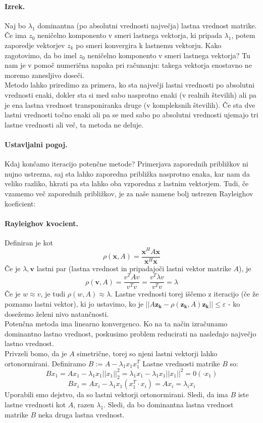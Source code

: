\documentclass[a4paper]{article}
\begin{document}
\paragraph{Izrek.} Naj bo \(\lambda_1\) dominantna (po absolutni vrednosti največja) lastna vrednost matrike. Če ima \(z_0\) neničelno komponento v smeri lastnega
vektorja, ki pripada \(\lambda_1\), potem zaporedje vektorjev \(z_k\) po smeri konvergira k lastnemu vektorju.
Kako zagotovimo, da bo imel \(z_0\) neničelno komponento v smeri lastnega vektorja? Tu nam je v pomoč numerična napaka pri računanju:
takega vektorja enostavno ne moremo zanesljivo doseči. \\
Metodo lahko priredimo za primera, ko sta največji lastni vrednosti po absolutni vrednosti enaki, dokler sta si med sabo nasprotno enaki (v realnih številih) ali
pa je ena lastna vrednost transponiranka druge (v kompleksnih številih). Če sta dve lastni vrednosti točno enaki ali pa se med sabo po absolutni vrednosti
ujemajo tri lastne vrednosti ali več, ta metoda ne deluje.
\paragraph{Ustavljalni pogoj.} Kdaj končamo iteracijo potenčne metode? Primerjava zaporednih približkov ni nujno ustrezna, saj sta lahko zaporedna približka nasprotno enaka,
kar nam da veliko razliko, hkrati pa sta lahko oba vzporedna z lastnim vektorjem. Tudi, če vzamemo več zaporednih približkov, je za naše namene bolj ustrezen Rayleighov koeficient:
\paragraph{Rayleighov kvocient.} Definiran je kot 
$$\rho (\mathbf{x}, A) = \frac{\mathbf{x}^HA\mathbf{x}}{\mathbf{x}^H\mathbf{x}}$$
Če je $\lambda, \mathbf{v}$ lastni par (lastna vrednost in pripadajoči lastni vektor matrike $A$), je
$$\rho (\mathbf{v}, A) = \frac{v^TAv}{v^Tv} = \frac{v^T\lambda v}{v^Tv} = \lambda$$
Če je $w \approx v$, je tudi $\rho (w, A) \approx \lambda$. Lastne vrednosti torej iščemo z iteracijo (če že poznamo lastni vektor),
ki jo ustavimo, ko je $||A\mathbf{z_k} - \rho(\mathbf{z_k}, A)\mathbf{z_k}|| \leq \varepsilon$ - ko dosežemo želeni nivo natančnosti. \\
Potenčna metoda ima linearno konvergenco.
Ko na ta način izračunamo dominantno lastno vrednost, poskusimo problem reducirati na naslednjo največjo lastno vrednost. \\
Privzeli bomo, da je $A$ simetrične, torej so njeni lastni vektorji lahko ortonormirani. Definiramo $B := A - \lambda_1x_1x^T_1$
Lastne vrednosti matrike $B$ so:
$$Bx_1 = Ax_1 - \lambda_1x_1||x_1||_2^2 = \lambda_1x_1 - \lambda_1x_1||x_1||^2 = 0 \left(\cdot x_1\right)$$
$$Bx_i = Ax_i - \lambda_1x_1(x_1^T \cdot x_i) = Ax_i = \lambda_ix_i$$
Uporabili smo dejstvo, da so lastni vektorji ortonormirani. Sledi, da ima $B$ iste lastne vrednosti kot $A$, razen $\lambda_1$.
Sledi, da bo dominantna lastna vrednost matrike $B$ neka druga lastna vrednost. \\
\end{document}
